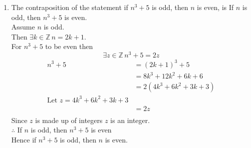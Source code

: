 \documentclass[12pt letter]{report}
\begin{document}

\begin{myproof}

  \begin{enumerate}
    \item
          The contraposition of the statement if $n^3 + 5$ is odd, then $n$ is even, is If $n$ is odd, then $n^3 + 5$
          is even.\\
          Assume $n$ is odd.\\
          Then $\exists k \in\mathbb{Z}\, n = 2k + 1$.\\
          For $n^3 + 5$ to be even then
          \[
            \exists z \in \mathbb{Z} \, n^3 + 5 = 2z
          \]
          \begin{align*}
            n^3 + 5 & = \left( 2k + 1 \right)^3 + 5            \\
                    & = 8k^3 + 12k^2 + 6k + 6                  \\
                    & = 2 \left( 4k^3 + 6k^2 + 3k + 3  \right) \\
            \text{Let } z =  4k^3 + 6k^2 + 3k + 3              \\
                    & = 2z                                     \\
          \end{align*}
          Since $z$ is made up of integers $z$ is an integer.\\
          $\therefore$ If $n$ is odd, then $n^3 + 5$ is even\\
          Hence if $n^3 + 5$ is odd, then $n$ is even.


\end{enumerate}
\end{myproof}
\end{document}
